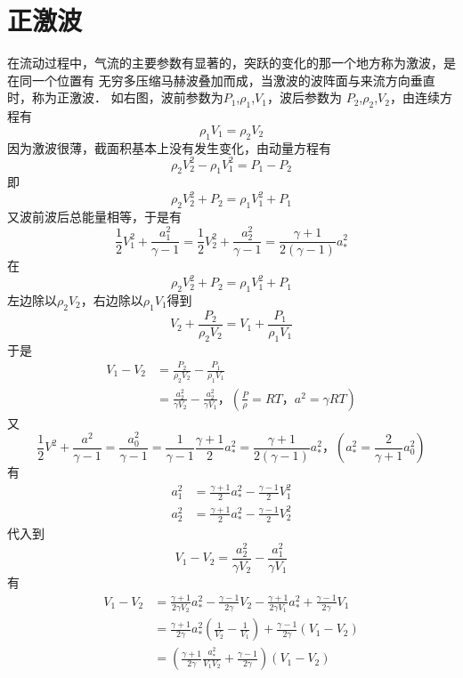 \section{正激波}
在流动过程中，气流的主要参数有显著的，突跃的变化的那一个地方称为激波，是在同一个位置有
无穷多压缩马赫波叠加而成，当激波的波阵面与来流方向垂直时，称为正激波．
如右图，波前参数为$P_1$,$\rho_1$,$V_1$，波后参数为
$P_2$,$\rho_2$,$V_2$，由连续方程有
\[
	\rho_1V_1=\rho_2V_2
\]
因为激波很薄，截面积基本上没有发生变化，由动量方程有
\[
	\rho_2V_2^2-\rho_1V_1^2=P_1-P_2
\]
即
\[
	\rho_2V_2^2+P_2=\rho_1V_1^2+P_1
\]
又波前波后总能量相等，于是有
\[
	\frac{1}{2 }V_1^2+\frac{a_1^2}{\gamma-1 }=\frac{1}{2 }V_2^2+\frac{a_2^2}{\gamma-1 }=
	\frac{\gamma+1 }{2(\gamma-1)}a_*^2
\]
在
\[
	\rho_2V_2^2+P_2=\rho_1V_1^2+P_1
\]
左边除以$\rho_2V_2$，右边除以$\rho_1V_1$得到
\[
	V_2+\frac{P_2}{\rho_2V_2}=V_1+\frac{P_1}{\rho_1V_1}
\]
于是
\begin{equation}
	\begin{split}
		V_1-V_2 & =\frac{P_2}{\rho_2V_2}-\frac{P_1}{\rho_1V_1}                                                     \\
		        & =\frac{a_2^2}{\gamma V_2}-\frac{a_2^2}{\gamma V_1 }，\left(\frac{P}{\rho}=RT，a^2=\gamma RT\right)
	\end{split}
	\label{eq:14}
\end{equation}
又
\[
	\frac{1}{2 }V^2+\frac{a^2}{\gamma-1 }=\frac{a_0^2}{\gamma-1 }=\frac{1}{\gamma-1 }
	\frac{\gamma+1 }{2 }a_*^2=\frac{\gamma+1 }{2(\gamma-1 )}a_*^2，(a_*^2=\frac{2}{\gamma+1 }a_0^2)
\]
有
\begin{equation}
	\begin{split}
		a_1^2 & =\frac{\gamma+1 }{2 }a_*^2-\frac{\gamma-1 }{2 }V_1^2 \\
		a_2^2 & =\frac{\gamma+1 }{2 }a_*^2-\frac{\gamma-1 }{2 }V_2^2
	\end{split}
	\label{eq:15 }
\end{equation}
代入到
\[
	V_1-V_2=\frac{a_2^2}{\gamma V_2}-\frac{a_1^2}{\gamma V_1 }
\]
有
\begin{equation}
	\begin{split}
		V_1-V_2 & =\frac{\gamma+1 }{2\gamma V_2}a_*^2
		-\frac{\gamma-1 }{2\gamma}V_2-\frac{\gamma+1 }{2\gamma V_1}a_*^2+
		\frac{\gamma-1 }{2\gamma}V_1                            \\
		        & =\frac{\gamma+1 }{2\gamma}a_*^2\left(
		\frac{1}{V_2}-\frac{1}{V_1}\right)+
		\frac{\gamma-1 }{2\gamma}(V_1-V_2)                      \\
		        & =\left(\frac{\gamma+1 }{2\gamma}\frac{a_*^2 }
		{V_1V_2}+\frac{\gamma-1 }{2\gamma}\right)(V_1-V_2)
	\end{split}
	\label{eq:16}
\end{equation}

